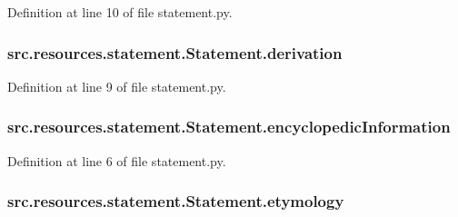 Definition at line 10 of file statement.\+py.

\hypertarget{classsrc_1_1resources_1_1statement_1_1_statement_a40efc05a7dcf877a81b850f7a0a8650a}{
\subsubsection[{derivation}]{\setlength{\rightskip}{0pt plus 5cm}src.\+resources.\+statement.\+Statement.\+derivation}}\label{classsrc_1_1resources_1_1statement_1_1_statement_a40efc05a7dcf877a81b850f7a0a8650a}


Definition at line 9 of file statement.\+py.

\hypertarget{classsrc_1_1resources_1_1statement_1_1_statement_a189fd8f66328780bd39764b33b4220a7}{
\subsubsection[{encyclopedic\+Information}]{\setlength{\rightskip}{0pt plus 5cm}src.\+resources.\+statement.\+Statement.\+encyclopedic\+Information}}\label{classsrc_1_1resources_1_1statement_1_1_statement_a189fd8f66328780bd39764b33b4220a7}


Definition at line 6 of file statement.\+py.

\hypertarget{classsrc_1_1resources_1_1statement_1_1_statement_a48b1b474f5ffe8cc00be3ae662ce490e}{
\subsubsection[{etymology}]{\setlength{\rightskip}{0pt plus 5cm}src.\+resources.\+statement.\+Statement.\+etymology}}\label{classsrc_1_1resources_1_1statement_1_1_statement_a48b1b474f5ffe8cc00be3ae662ce490e}


